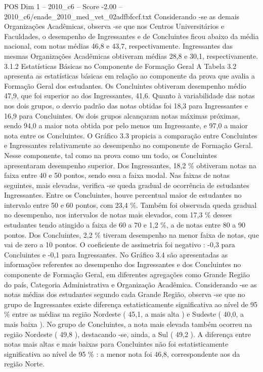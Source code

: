 \begin{textsample}{POS Dim 1 – 2010\_c6 – Score -2.00 – 2010\_c6/enade\_2010\_med\_vet\_02adfbfccf.txt}
Considerando -se as demais Organizações Acadêmicas, observa -se que nos Centros Universitários e Faculdades, o desempenho de Ingressantes e de Concluintes ficou abaixo da média nacional, com notas médias 46,8 e 43,7, respectivamente.
Ingressantes das mesmas Organizações Acadêmicas obtiveram médias 28,8 e 30,1, respectivamente. 3.1.2 Estatísticas Básicas no Componente de Formação Geral A Tabela 3.2 apresenta as estatísticas básicas em relação ao componente da prova que avalia a Formação Geral dos estudantes.
Os Concluintes obtiveram desempenho médio 47,9, que foi superior ao dos Ingressantes, 41,6.
Quanto à variabilidade das notas nos dois grupos, o desvio padrão das notas obtidas foi 18,3 para Ingressantes e 16,9 para Concluintes.
Os dois grupos alcançaram notas máximas próximas, sendo 94,0 a maior nota obtida por pelo menos um Ingressante, e 97,0 a maior nota entre os Concluintes.
O Gráfico 3.3 propicia a comparação entre Concluintes e Ingressantes relativamente ao desempenho no componente de Formação Geral.
Nesse componente, tal como na prova como um todo, os Concluintes apresentaram desempenho superior.
Dos Ingressantes, 18,2 \% obtiveram notas na faixa entre 40 e 50 pontos, sendo essa a faixa modal.
Nas faixas de notas seguintes, mais elevadas, verifica -se queda gradual de ocorrência de estudantes Ingressantes.
Entre os Concluintes, houve percentual maior de estudantes no intervalo entre 50 e 60 pontos, com 23,4 \%.
Também foi observada queda gradual no desempenho, nos intervalos de notas mais elevados, com 17,3 \% desses estudantes tendo atingido a faixa de 60 a 70 e 1,2 \%, a de notas entre 80 a 90 pontos.
Dos Concluintes, 2,2 \% tiveram desempenho na menor faixa de notas, que vai de zero a 10 pontos.
O coeficiente de assimetria foi negativo : -0,3 para Concluintes e -0,1 para Ingressantes.
No Gráfico 3.4 são apresentadas as informações referentes ao desempenho dos Ingressantes e dos Concluintes no componente de Formação Geral, em diferentes agregações como Grande Região do país, Categoria Administrativa e Organização Acadêmica.
Considerando -se as notas médias dos estudantes segundo cada Grande Região, observa -se que no grupo de Ingressantes existe diferença estatisticamente significativa ao nível de 95 \% entre as médias na região Nordeste ( 45,1, a mais alta ) e Sudeste ( 40,0, a mais baixa ).
No grupo de Concluintes, a nota mais elevada também ocorreu na região Nordeste ( 49,8 ), destacando -se, ainda, a Sul ( 49,2 ).
A diferença entre notas mais altas e mais baixas para Concluintes não foi estatisticamente significativa ao nível de 95 \% : a menor nota foi 46,8, correspondente aos da região Norte.

\end{textsample}
